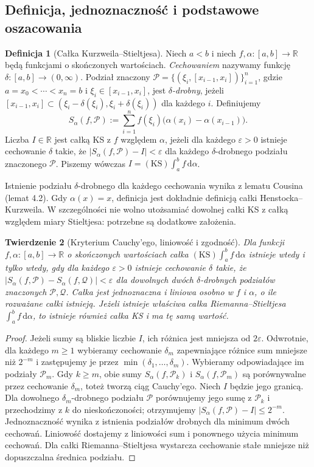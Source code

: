 \documentclass[11pt,a4paper]{article}
\numberwithin{equation}{section}
\theoremstyle{plain}
\newtheorem{twierdzenie}{Twierdzenie}[section]
\theoremstyle{definition}
\newtheorem{definicja}[twierdzenie]{Definicja}
\theoremstyle{remark}
\newcommand{\R}{\mathbb R}
\newcommand{\KS}{\mathrm{KS}}
\begin{document}
\subsection*{Definicja, jednoznaczność i podstawowe oszacowania}
\begin{definicja}[Całka Kurzweila--Stieltjesa]
Niech $a<b$ i niech $f,\alpha:[a,b]\to\R$ będą funkcjami o skończonych wartościach. \emph{Cechowaniem} nazywamy funkcję $\delta:[a,b]\to(0,\infty)$. Podział znaczony $\mathcal P=\{(\xi_i,[x_{i-1},x_i])\}_{i=1}^n$, gdzie $a=x_0<\cdots<x_n=b$ i $\xi_i\in[x_{i-1},x_i]$, jest \emph{$\delta$-drobny}, jeżeli $[x_{i-1},x_i]\subset(\xi_i-\delta(\xi_i),\xi_i+\delta(\xi_i))$ dla każdego $i$. Definiujemy
\[
 S_\alpha(f,\mathcal P):=\sum_{i=1}^n f(\xi_i)\bigl(\alpha(x_i)-\alpha(x_{i-1})\bigr).
\]
Liczba $I\in\R$ jest całką KS z $f$ względem $\alpha$, jeżeli dla każdego $\varepsilon>0$ istnieje cechowanie $\delta$ takie, że $|S_\alpha(f,\mathcal P)-I|<\varepsilon$ dla każdego $\delta$-drobnego podziału znaczonego $\mathcal P$. Piszemy wówczas $I=(\KS)\int_a^b f\,\mathrm d\alpha$.
\end{definicja}
Istnienie podziału $\delta$-drobnego dla każdego cechowania wynika z lematu Cousina (lemat 4.2). Gdy $\alpha(x)=x$, definicja jest dokładnie definicją całki Henstocka--Kurzweila. W szczególności nie wolno utożsamiać dowolnej całki KS z całką względem miary Stieltjesa: potrzebne są dodatkowe założenia.

\begin{twierdzenie}[Kryterium Cauchy'ego, liniowość i zgodność]
\label{tw:ks-cauchy}
Dla funkcji $f,\alpha:[a,b]\to\R$ o skończonych wartościach całka $(\KS)\int_a^b f\,\mathrm d\alpha$ istnieje wtedy i tylko wtedy, gdy dla każdego $\varepsilon>0$ istnieje cechowanie $\delta$ takie, że
$|S_\alpha(f,\mathcal P)-S_\alpha(f,\mathcal Q)|<\varepsilon$ dla dowolnych dwóch $\delta$-drobnych podziałów znaczonych $\mathcal P,\mathcal Q$. Całka jest jednoznaczna i liniowa osobno w $f$ i $\alpha$, o ile rozważane całki istnieją. Jeżeli istnieje właściwa całka Riemanna--Stieltjesa $\int_a^b f\,\mathrm d\alpha$, to istnieje również całka KS i ma tę samą wartość.
\end{twierdzenie}
\begin{proof}
Jeżeli sumy są bliskie liczbie $I$, ich różnica jest mniejsza od $2\varepsilon$. Odwrotnie, dla każdego $m\ge1$ wybieramy cechowanie $\delta_m$ zapewniające różnice sum mniejsze niż $2^{-m}$ i zastępujemy je przez $\min(\delta_1,\ldots,\delta_m)$. Wybieramy odpowiadające im podziały $\mathcal P_m$. Gdy $k\ge m$, obie sumy $S_\alpha(f,\mathcal P_k)$ i $S_\alpha(f,\mathcal P_m)$ są porównywalne przez cechowanie $\delta_m$, toteż tworzą ciąg Cauchy'ego. Niech $I$ będzie jego granicą. Dla dowolnego $\delta_m$-drobnego podziału $\mathcal P$ porównujemy jego sumę z $\mathcal P_k$ i przechodzimy z $k$ do nieskończoności; otrzymujemy $|S_\alpha(f,\mathcal P)-I|\le2^{-m}$. Jednoznaczność wynika z istnienia podziałów drobnych dla minimum dwóch cechowań. Liniowość dostajemy z liniowości sum i ponownego użycia minimum cechowań. Dla całki Riemanna--Stieltjesa wystarcza cechowanie stałe mniejsze niż dopuszczalna średnica podziału.
\end{proof}
\end{document}
